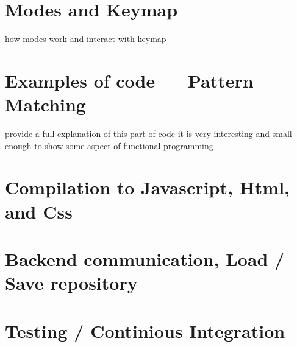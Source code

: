 \documentclass[master.tex]{subfiles}
\begin{document}
\section{Modes and Keymap}
  how modes work and interact with keymap
\section{Examples of code --- Pattern Matching}
provide a full explanation of this part of code it is very interesting and small
enough to show some aspect of functional programming
\section{Compilation to Javascript, Html, and Css}

\section{Backend communication, Load / Save repository}

\section{Testing / Continious Integration}





\end{document}
